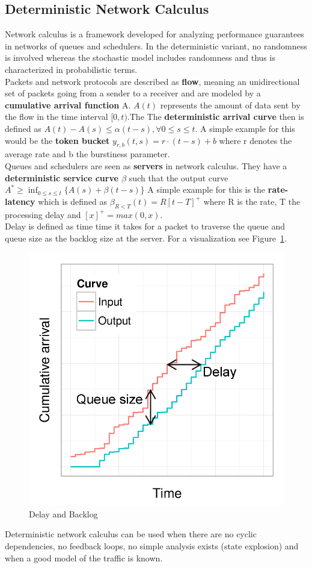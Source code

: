 \subsection{Deterministic Network Calculus}
Network calculus is a framework developed for analyzing performance guarantees in networks of queues and schedulers.
In the deterministic variant, no randomness is involved whereas the stochastic model includes randomness and thus is characterized in probabilistic terms.\\
Packets and network protocols are described as \textbf{flow}, meaning an unidirectional set of packets going from a sender to a receiver and are modeled by a \textbf{cumulative arrival function} A.
$A(t)$ represents the amount of data sent by the flow in the time interval $[0,t)$.The 
The \textbf{deterministic arrival curve} then is defined as $A(t) - A(s) \leq \alpha (t-s), \forall 0 \leq s \leq t$.
A simple example for this would be the \textbf{token bucket} $y_{r,b}(t,s) = r \cdot (t-s) + b$ where r denotes the average rate and b the burstiness parameter.\\
Queues and schedulers are seen as \textbf{servers} in network calculus.
They have a \textbf{deterministic service curve $\beta$} such that the output curve $A^* \geq \inf_{0 \leq s \leq t} \{A(s) + \beta (t-s)\}$
A simple example for this is the \textbf{rate-latency} which is defined as $\beta_{R<T}(t) = R[t - T]^+$ where R is the rate, T the processing delay and $[x]^+ = max(0,x)$.\\
Delay is defined as time time it takes for a packet to traverse the queue and queue size as the backlog size at the server.
For a visualization see Figure~\ref{fig:nc_delay_and_backlog}.
\begin{figure}[h]
  \centering
  \includegraphics[width=.4\textwidth]{figures/nc_delay_and_backlog.png}
  \caption{Delay and Backlog}\label{fig:nc_delay_and_backlog}
\end{figure}

Deterministic network calculus can be used when there are no cyclic dependencies, no feedback loops, no simple analysis exists (state explosion) and when a good model of the traffic is known.

